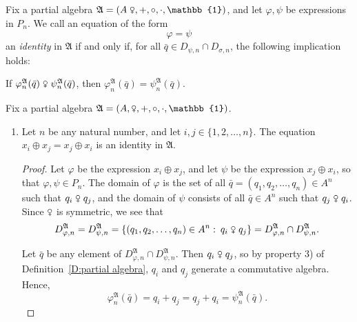 \documentclass{scrartcl}
\renewcommand{\phi}{\varphi}
\newcommand{\FA}{\mathfrak{A}}
\newcommand{\com}{\mathrel{\venus}}
\begin{document}
\begin{definition}
Fix a partial algebra $\FA=(A\com,+,\circ,\cdot,\mathbb{1})$, and let $\phi,\psi$ be expressions in $P_n$. We call an equation of the form
\[
\phi=\psi 
\]
an \emph{identity} in $\FA$ if and only if, for all $\bar{q}\in D_{\psi,n}\cap D_{\sigma,n}$, the following implication holds:
\begin{center}
If $\phi_n^{\FA}(\bar{q})\com\psi_n^{\FA}(\bar{q})$, then  $\phi_n^{\FA}(\bar{q})=\psi_n^{\FA}(\bar{q})$.
\end{center}
\end{definition}

\begin{examples} Fix a partial algebra $\FA=(A,\com,+,\circ,\cdot,\mathbb{1})$.
\begin{enumerate}[(1)]
\item
Let $n$ be any natural number, and let $i,j\in\{1,2,\ldots,n\}$. The equation $x_i\oplus x_j=x_j\oplus x_i$ is an identity in $\FA$.
\begin{proof}
Let $\phi$ be the expression $x_i\oplus x_j$, and let $\psi$ be the expression $x_j\oplus x_i$, so that $\phi,\psi\in P_n$. The domain of $\phi$ is the set of all $\bar{q}=(q_1,q_2,\ldots,q_n)\in A^n$ such that $q_i\com q_j$, and the domain of $\psi$ consists of all $\bar{q}\in A^n$ such that $q_j\com q_i$. Since $\venus$ is symmetric, we see that
\[
D_{\phi,n}^{\FA}=D_{\psi,n}^{\FA}=\{(q_1,q_2,\ldots,q_n)\in A^n\,\colon\,q_i\com q_j\}=D_{\phi,n}^{\FA}\cap D_{\psi,n}^{\FA}.
\]


Let $\bar{q}$ be any element of $D_{\phi,n}^{\FA}\cap D_{\psi,n}^{\FA}$. Then $q_i\com q_j$, so by property 3) of Definition~\ref{D:partial algebra}, $q_i$ and $q_j$ generate a commutative algebra. Hence,
\[
\phi_n^{\FA}(\bar{q}) = q_i+q_j = q_j+q_i = \psi_n^{\FA}(\bar{q}).
\]
\end{proof}


\end{enumerate}
\end{examples}
\end{document}
